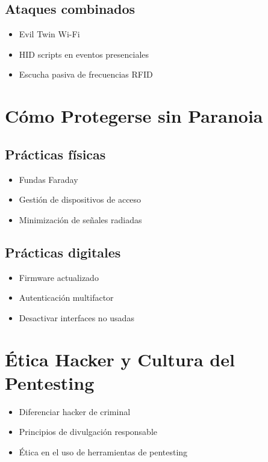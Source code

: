 \documentclass[a4paper,12pt]{article}
\begin{document}
\subsection{Ataques combinados}
\begin{itemize}
    \item Evil Twin Wi-Fi
    \item HID scripts en eventos presenciales
    \item Escucha pasiva de frecuencias RFID
\end{itemize}

\section{Cómo Protegerse sin Paranoia}

\subsection{Prácticas físicas}
\begin{itemize}
    \item Fundas Faraday
    \item Gestión de dispositivos de acceso
    \item Minimización de señales radiadas
\end{itemize}

\subsection{Prácticas digitales}
\begin{itemize}
    \item Firmware actualizado
    \item Autenticación multifactor
    \item Desactivar interfaces no usadas
\end{itemize}

\section{Ética Hacker y Cultura del Pentesting}

\begin{itemize}
    \item Diferenciar hacker de criminal
    \item Principios de divulgación responsable
    \item Ética en el uso de herramientas de pentesting
\end{itemize}
\end{document}
